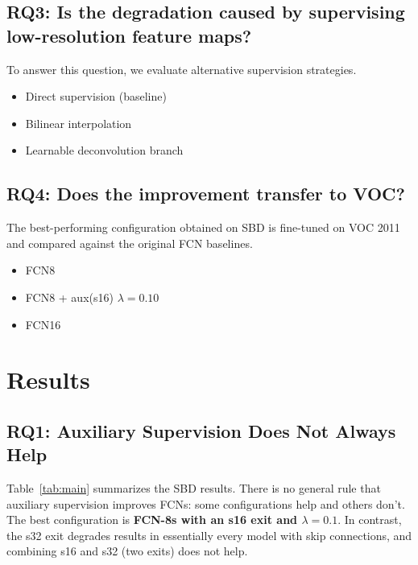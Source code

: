 \documentclass[runningheads]{llncs}
\begin{document}
    \subsection{RQ3: Is the degradation caused by supervising low-resolution feature maps?}
    
    To answer this question, we evaluate alternative supervision strategies.
    
    \begin{itemize}
        \item Direct supervision (baseline)
        \item Bilinear interpolation
        \item Learnable deconvolution branch
    \end{itemize}
    
    \subsection{RQ4: Does the improvement transfer to VOC?}
    
    The best-performing configuration obtained on SBD is fine-tuned on
    VOC 2011 and compared against the original FCN baselines.

    \begin{itemize}
        \item FCN8 
        \item FCN8 + aux(s16) $\lambda=0.10$
        \item FCN16
    \end{itemize}


\section{Results}
\label{sec:results}

    \subsection{RQ1: Auxiliary Supervision Does Not Always Help}

    Table~\ref{tab:main} summarizes the SBD results. There is no general rule that
    auxiliary supervision improves FCNs: some configurations help and others don't. The best configuration is \textbf{FCN-8s with an s16 exit and $\lambda=0.1$}. In contrast, the s32 exit degrades results in essentially every model with skip connections, and combining s16 and s32 (two exits) does not help.
\end{document}
